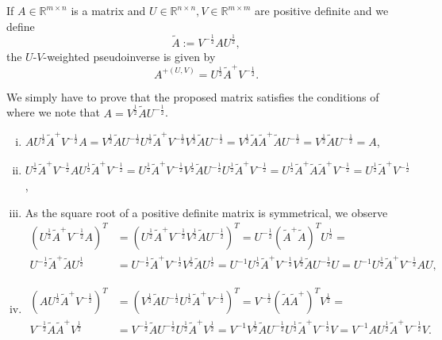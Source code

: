 \documentclass[a4paper,11pt]{report}
\begin{document}
\begin{Lem}\label{Lem:weighted}
If $A\in\mathbb{R}^{m\times n}$ is a matrix and $U\in\mathbb{R}^{n\times n},V\in\mathbb{R}^{m\times m}$ are positive definite and we define
\begin{equation}
\tilde{A}:=V^{-\frac12}AU^{\frac12},
\end{equation}
the $U$-$V$-weighted pseudoinverse is given by
\begin{equation}
A^{+(U,V)}=U^{\frac12}\tilde{A}^+V^{-\frac12}.
\end{equation}
\end{Lem}

\begin{Bew}
We simply have to prove that the proposed matrix satisfies the conditions of  where we note that $A=V^{\frac12}\tilde{A}U^{-\frac12}$.
\begin{enumerate}[(i)]
\item
$AU^{\frac12}\tilde{A}^+V^{-\frac12}A=V^{\frac12}\tilde{A}U^{-\frac12}U^{\frac12}\tilde{A}^+V^{-\frac12}V^{\frac12}\tilde{A}U^{-\frac12}=V^{\frac12}\tilde{A}\tilde{A}^+\tilde{A}U^{-\frac12}=V^{\frac12}\tilde{A}U^{-\frac12}=A$, 
\item
$U^{\frac12}\tilde{A}^+V^{-\frac12}AU^{\frac12}\tilde{A}^+V^{-\frac12}=U^{\frac12}\tilde{A}^+V^{-\frac12}V^{\frac12}\tilde{A}U^{-\frac12}U^{\frac12}\tilde{A}^+V^{-\frac12}=U^{\frac12}\tilde{A}^+\tilde{A}\tilde{A}^+V^{-\frac12}=U^{\frac12}\tilde{A}^+V^{-\frac12}$,
\item
As the square root of a positive definite matrix is symmetrical, we observe
\begin{align*}
\left(U^{\frac12}\tilde{A}^+V^{-\frac12}A\right)^T&=
\left(U^{\frac12}\tilde{A}^+V^{-\frac12}V^{\frac12}\tilde{A}U^{-\frac12}\right)^T=
U^{-\frac12}\left(\tilde{A}^+\tilde{A}\right)^TU^{\frac12}=\\
U^{-\frac12}\tilde{A}^+\tilde{A}U^{\frac12}&=
U^{-\frac12}\tilde{A}^+V^{-\frac12}V^{\frac12}\tilde{A}U^{\frac12}=
U^{-1}U^{\frac12}\tilde{A}^+V^{-\frac12}V^{\frac12}\tilde{A}U^{-\frac12}U=U^{-1}U^{\frac12}\tilde{A}^+V^{-\frac12}AU,
\end{align*}
\item
\begin{align*}
\left(AU^{\frac12}\tilde{A}^+V^{-\frac12}\right)^T&=
\left(V^{\frac12}\tilde{A}U^{-\frac12}U^{\frac12}\tilde{A}^+V^{-\frac12}\right)^T=
V^{-\frac12}\left(\tilde{A}\tilde{A}^+\right)^TV^{\frac12}=\\
V^{-\frac12}\tilde{A}\tilde{A}^+V^{\frac12}&=
V^{-\frac12}\tilde{A}U^{-\frac12}U^{\frac12}\tilde{A}^+V^{\frac12}=
V^{-1}V^{\frac12}\tilde{A}U^{-\frac12}U^{\frac12}\tilde{A}^+V^{-\frac12}V=
V^{-1}AU^{\frac12}\tilde{A}^+V^{-\frac12}V.
\end{align*}
\end{enumerate}
\end{Bew}
\end{document}

